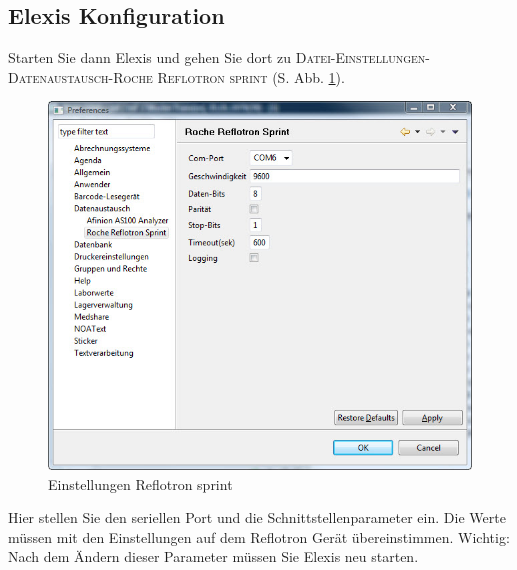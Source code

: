 \documentclass[a4paper]{scrartcl}
\begin{document}
\subsection{Elexis Konfiguration}
Starten Sie dann Elexis und gehen Sie dort zu \textsc{Datei-Einstellungen-Datenaustausch-Roche Reflotron sprint} (S. Abb. \ref{fig:config}).
\begin{figure}[h]
    \includegraphics{config}
    \caption{Einstellungen Reflotron sprint}
    \label{fig:config}
\end{figure}
Hier stellen Sie den seriellen Port und die Schnittstellenparameter ein. Die Werte m\"ussen mit den Einstellungen auf dem Reflotron Ger\"at \"ubereinstimmen. Wichtig: Nach dem \"Andern dieser Parameter m\"ussen Sie Elexis neu starten.
\end{document}
